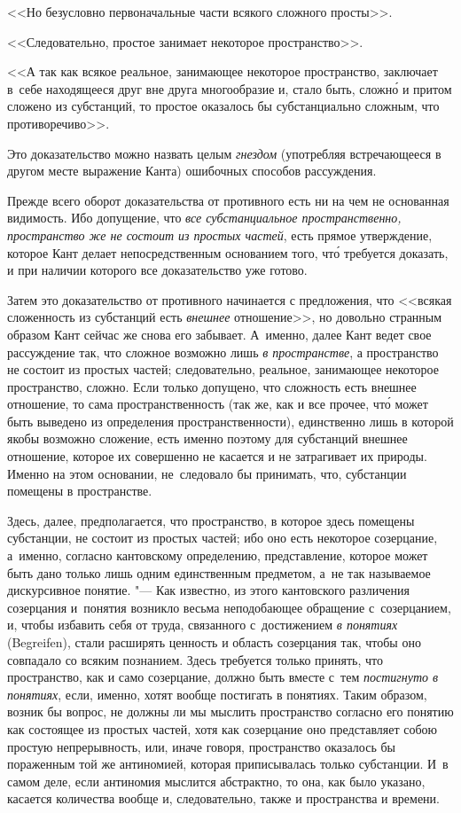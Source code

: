 <<Но безусловно первоначальные части всякого сложного просты>>.

<<Следовательно, простое занимает некоторое пространство>>.

<<А так как всякое реальное, занимающее некоторое пространство, заключает
в~себе находящееся друг вне друга многообразие и, стало быть, сложн\'{о}
и притом сложено из субстанций, то простое оказалось бы субстанциально
сложным, что противоречиво>>.

Это доказательство можно назвать целым {\em гнездом} (употребляя встречающееся
в другом месте выражение Канта) ошибочных способов рассуждения.

Прежде всего оборот доказательства от противного есть ни на чем не основанная
видимость. Ибо допущение, что {\em все субстанциальное пространственно,
пространство же не состоит из простых частей}, есть прямое утверждение,
которое Кант делает непосредственным основанием того, чт\'{о} требуется
доказать, и при наличии которого все доказательство уже готово.

Затем это доказательство от противного начинается с предложения, что <<всякая
сложенность из субстанций есть {\em внешнее} отношение>>, но довольно странным
образом Кант сейчас же снова его забывает. А~именно, далее Кант ведет свое
рассуждение так, что сложное возможно лишь {\em в пространстве}, а пространство
не состоит из простых частей; следовательно, реальное, занимающее некоторое
пространство, сложно. Если только допущено, что сложность есть внешнее
отношение, то сама пространственность (так же, как и все прочее, чт\'{о} может
быть выведено из определения пространственности), единственно лишь в которой
якобы возможно сложение, есть именно поэтому для субстанций внешнее отношение,
которое их совершенно не касается и не затрагивает их природы. Именно на этом
основании, не~следовало бы принимать, что, субстанции помещены в пространстве.

Здесь, далее, предполагается, что пространство, в которое здесь помещены
субстанции, не состоит из простых частей; ибо оно есть некоторое созерцание,
а~именно, согласно кантовскому определению, представление, которое может быть
дано только лишь одним единственным предметом, а~не так называемое дискурсивное
понятие. "--- Как известно, из этого кантовского различения созерцания
и~понятия возникло весьма неподобающее обращение с~созерцанием, и, чтобы
избавить себя от труда, связанного с~достижением {\em в понятиях} (Begreifen),
стали расширять ценность и область созерцания так, чтобы оно совпадало со
всяким познанием. Здесь требуется только принять, что пространство, как и само
созерцание, должно быть вместе с~тем {\em постигнуто в понятиях}, если, именно,
хотят вообще постигать в понятиях. Таким образом, возник бы вопрос, не должны
ли мы мыслить пространство согласно его понятию как состоящее из простых
частей, хотя как созерцание оно представляет собою простую непрерывность, или,
иначе говоря, пространство оказалось бы пораженным той же антиномией, которая
приписывалась только субстанции. И~в самом деле, если антиномия мыслится
абстрактно, то она, как было указано, касается количества вообще и,
следовательно, также и пространства и времени.

